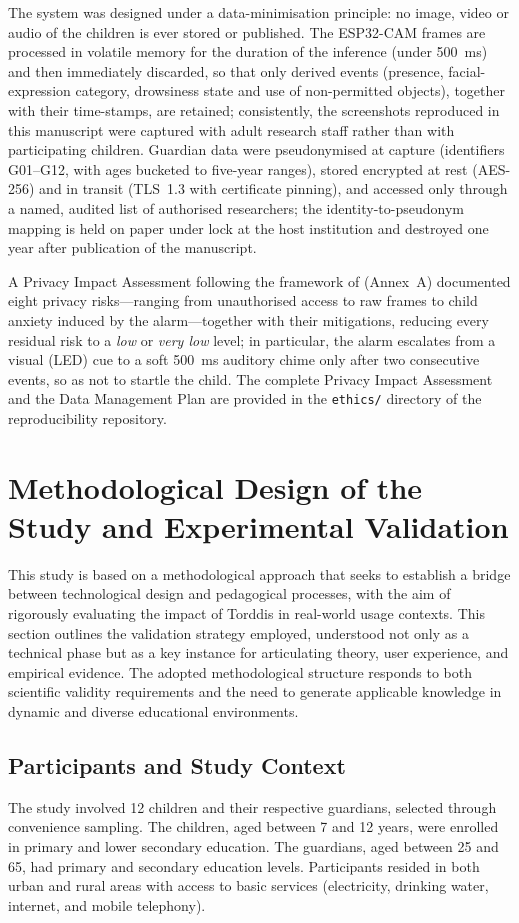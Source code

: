 The system was designed under a data-minimisation principle: no image, video or audio of the children is ever stored or published. The ESP32-CAM frames are processed in volatile memory for the duration of the inference (under 500~ms) and then immediately discarded, so that only derived events (presence, facial-expression category, drowsiness state and use of non-permitted objects), together with their time-stamps, are retained; consistently, the screenshots reproduced in this manuscript were captured with adult research staff rather than with participating children. Guardian data were pseudonymised at capture (identifiers G01--G12, with ages bucketed to five-year ranges), stored encrypted at rest (AES-256) and in transit (TLS~1.3 with certificate pinning), and accessed only through a named, audited list of authorised researchers; the identity-to-pseudonym mapping is held on paper under lock at the host institution and destroyed one year after publication of the manuscript.

A Privacy Impact Assessment following the framework of \citet{ISO-IEC27001-2022} (Annex~A) documented eight privacy risks---ranging from unauthorised access to raw frames to child anxiety induced by the alarm---together with their mitigations, reducing every residual risk to a \textit{low} or \textit{very low} level; in particular, the alarm escalates from a visual (LED) cue to a soft 500~ms auditory chime only after two consecutive events, so as not to startle the child. The complete Privacy Impact Assessment and the Data Management Plan are provided in the \texttt{ethics/} directory of the reproducibility repository.

\section{Methodological Design of the Study and Experimental Validation}
\label{section:fifth}
This study is based on a methodological approach that seeks to establish a bridge between technological design and pedagogical processes, with the aim of rigorously evaluating the impact of Torddis in real-world usage contexts. This section outlines the validation strategy employed, understood not only as a technical phase but as a key instance for articulating theory, user experience, and empirical evidence. The adopted methodological structure responds to both scientific validity requirements and the need to generate applicable knowledge in dynamic and diverse educational environments.

\subsection{Participants and Study Context}
The study involved 12 children and their respective guardians, selected through convenience sampling. The children, aged between 7 and 12 years, were enrolled in primary and lower secondary education. The guardians, aged between 25 and 65, had primary and secondary education levels. Participants resided in both urban and rural areas with access to basic services (electricity, drinking water, internet, and mobile telephony).

